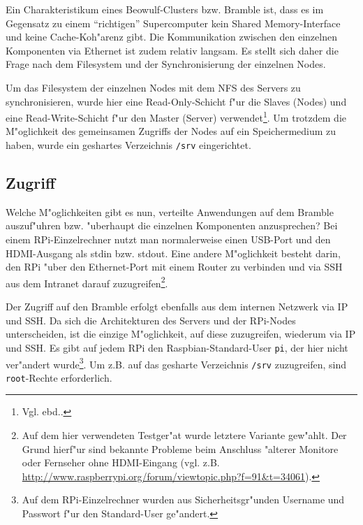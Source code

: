 Ein Charakteristikum eines Beowulf-Clusters bzw. Bramble ist, dass es im Gegensatz zu einem "`richtigen"' Supercomputer kein Shared Memory-Interface und keine Cache-Koh"arenz gibt. Die Kommunikation zwischen den einzelnen Komponenten via Ethernet ist zudem relativ langsam. Es stellt sich daher die Frage nach dem Filesystem und der Synchronisierung der einzelnen Nodes. 

Um das Filesystem der einzelnen Nodes mit dem NFS des Servers zu synchronisieren, wurde hier eine Read-Only-Schicht f"ur die Slaves (Nodes) und eine Read-Write-Schicht f"ur den Master (Server) verwendet\footnote{Vgl. ebd..}. Um trotzdem die M"oglichkeit des gemeinsamen Zugriffs der Nodes auf ein Speichermedium zu haben, wurde ein geshartes Verzeichnis \texttt{/srv} eingerichtet. 

\subsection{Zugriff}\label{Bramble Zugriff}

Welche M"oglichkeiten gibt es nun, verteilte Anwendungen auf dem Bramble auszuf"uhren bzw. "uberhaupt die einzelnen Komponenten anzusprechen? Bei einem RPi-Einzelrechner nutzt man normalerweise einen USB-Port und den HDMI-Ausgang als stdin bzw. stdout. Eine andere M"oglichkeit besteht darin, den RPi "uber den Ethernet-Port mit einem Router zu verbinden und via SSH aus dem Intranet darauf zuzugreifen\footnote{Auf dem hier verwendeten Testger"at wurde letztere Variante gew"ahlt. Der Grund hierf"ur sind bekannte Probleme beim Anschluss "alterer Monitore oder Fernseher ohne HDMI-Eingang (vgl. z.B. \url{http://www.raspberrypi.org/forum/viewtopic.php?f=91&t=34061}).}. 

Der Zugriff auf den Bramble erfolgt ebenfalls aus dem internen Netzwerk via IP und SSH. Da sich die Architekturen des Servers und der RPi-Nodes unterscheiden, ist die einzige M"oglichkeit, auf diese zuzugreifen, wiederum via IP und SSH. Es gibt auf jedem RPi den Raspbian-Standard-User \texttt{pi}, der hier nicht ver"andert wurde\footnote{Auf dem RPi-Einzelrechner wurden aus Sicherheitsgr"unden Username und Passwort f"ur den Standard-User ge"andert.}. Um z.B. auf das gesharte Verzeichnis \texttt{/srv} zuzugreifen, sind \texttt{root}-Rechte erforderlich. 
\endinput 
